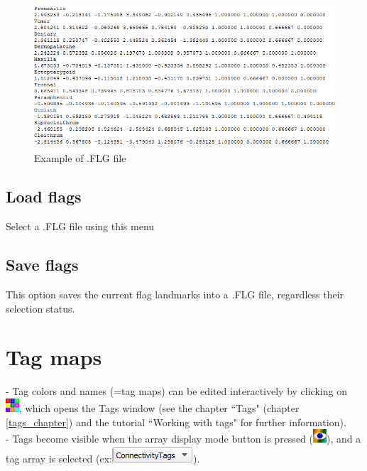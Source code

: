 \begin{figure}
  \centering
  \includegraphics[scale=0.5]{images/07/flags/FLG_file.png}
 \caption{Example of .FLG file}
\label{FLG_file}
\end{figure}

\subsection{Load flags}
Select a .FLG file using this menu

\subsection{Save flags}
This option saves the current flag landmarks into a .FLG file, regardless their selection status.


\section{Tag maps}


- Tag colors and names (=tag maps) can be edited interactively by
clicking on \includegraphics[scale=0.7]{images/07/tagmaps/tagmaps.png}, which opens the Tags window (see the chapter
``Tags" (chapter \ref{tags_chapter}) and the tutorial ``Working with tags" for
further information).\\
- Tags become visible when the array display mode button is pressed (\includegraphics[scale=0.7]{images/04/show_color_scale.png}), and a tag array is selected (ex:\includegraphics[scale=0.5]{images/04/scalarcombo_tag.png}).

